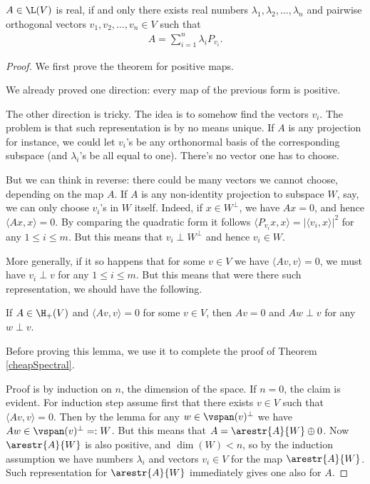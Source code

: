 \begin{lause}\label{cheapSpectral}
	$A \in \L(V)$ is real, if and only there exists real numbers $\lambda_{1}, \lambda_{2}, \ldots, \lambda_{n}$ and pairwise orthogonal vectors $v_{1}, v_{2}, \ldots, v_{n} \in V$ such that
	\begin{align}\label{spectralrepr}
		A = \sum_{i = 1}^{n} \lambda_{i} P_{v_{i}}.
	\end{align}
\end{lause}
\begin{proof}
	We first prove the theorem for positive maps.

	We already proved one direction: every map of the previous form is positive.

	The other direction is tricky. The idea is to somehow find the vectors $v_{i}$. The problem is that such representation is by no means unique. If $A$ is any projection for instance, we could let $v_{i}$'s be any orthonormal basis of the corresponding subspace (and $\lambda_{i}$'s be all equal to one). There's no vector one has to choose.

	But we can think in reverse: there could be many vectors we cannot choose, depending on the map $A$. If $A$ is any non-identity projection to subspace $W$, say, we can only choose $v_{i}$'s in $W$ itself. Indeed, if $x \in W^{\perp}$, we have $A x = 0$, and hence $\langle A x, x \rangle = 0$. By comparing the quadratic form it follows $\langle P_{v_{i}} x, x \rangle = |\langle v_{i}, x \rangle|^{2}$ for any $1 \leq i \leq m$. But this means that $v_{i} \perp W^{\perp}$ and hence $v_{i} \in W$.

	More generally, if it so happens that for some $v \in V$ we have $\langle A v, v \rangle = 0$, we must have $v_{i} \perp v$ for any $1 \leq i \leq m$. But this means that were there such representation, we should have the following.

	\begin{lem}\label{spectral_zero_lemma}
		If $A \in \H_{+}(V)$ and $\langle A v, v \rangle = 0$ for some $v \in V$, then $A v = 0$ and $A w \perp v$ for any $w \perp v$.
	\end{lem}

	Before proving this lemma, we use it to complete the proof of Theorem \ref{cheapSpectral}.

	Proof is by induction on $n$, the dimension of the space. If $n = 0$, the claim is evident. For induction step assume first that there exists $v \in V$ such that $\langle A v, v \rangle = 0$. Then by the lemma for any $w \in \vspan(v)^{\perp}$ we have $A w \in \vspan(v)^{\perp} =: W$. But this means that $A = \arestr{A}{W} \oplus 0$. Now $\arestr{A}{W}$ is also positive, and $\dim(W) < n$, so by the induction assumption we have numbers $\lambda_{i}$ and vectors $v_{i} \in V$ for the map $\arestr{A}{W}$. Such representation for $\arestr{A}{W}$ immediately gives one also for $A$.


\end{proof}
